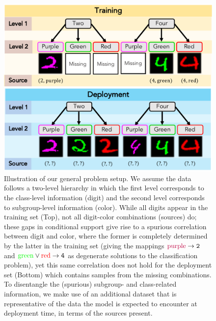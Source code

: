 \begin{figure}[tb]
    \centering
    \includegraphics[width=0.7\columnwidth]{supmatch/figures/illustrations/problem_setup.pdf}
    \caption{%
      Illustration of our general problem setup. 
      We assume the data follows a two-level hierarchy in which the first level corresponds to the class-level information (digit) and the second level corresponds to subgroup-level information (color).
      While all digits appear in the training set (Top), not all digit-color combinations (sources) do; these gaps in conditional support give rise to a spurious correlation between digit and color, where the former is completely determined by the latter in the training set (giving the mappings $\textrm{{\color{purple}purple}} \rightarrow \texttt{2}$ and $\textrm{{\color{green}green}} \lor \textrm{{\color{red}red}} \rightarrow \texttt{4}$ as degenerate solutions to the classification problem), yet this same correlation does not hold for the deployment set (Bottom) which contains samples from the missing combinations.
      To disentangle the (spurious) subgroup- and class-related information, we make use of an additional dataset that is representative of the data the model is expected to encounter at deployment time, in terms of the sources present.
    }%
    \label{fig:problem-setup}
\end{figure}
